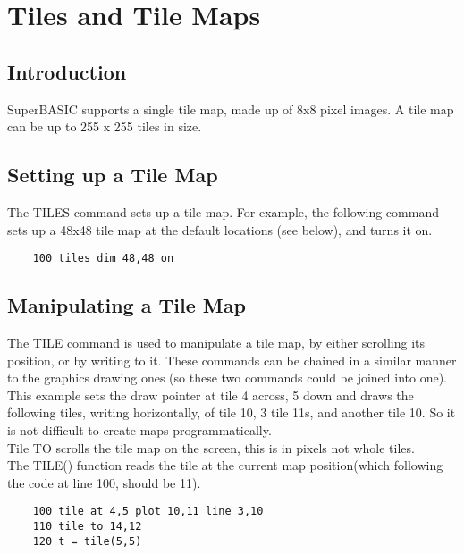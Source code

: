 \chapter{Tiles and Tile Maps}

\section{Introduction}

SuperBASIC supports a single tile map, made up of 8x8 pixel images. A tile map can be up to 255 x 255 tiles in size.

\section{Setting up a Tile Map}

The TILES command sets up a tile map. For example, the following command sets up a 48x48 tile map at the default locations (see below), and turns it on.

\begin{verbatim}
	100 tiles dim 48,48 on
\end{verbatim}

\section{Manipulating a Tile Map}

The TILE command is used to manipulate a tile map, by either scrolling its position, or by writing to it.  These commands can be chained in a similar manner to the graphics drawing ones (so these two commands could be joined into one).\\

This example sets the draw pointer at tile 4 across, 5 down and draws the following tiles, writing horizontally, of tile 10, 3 tile 11s, and another tile 10. So it is not difficult to create maps programmatically.\\

Tile TO scrolls the tile map on the screen, this is in pixels not whole tiles.\\

The TILE() function reads the tile at the current map position(which following the code at line 100, should be 11).

\begin{verbatim}
	100 tile at 4,5 plot 10,11 line 3,10
	110 tile to 14,12
	120 t = tile(5,5)
\end{verbatim}
		
